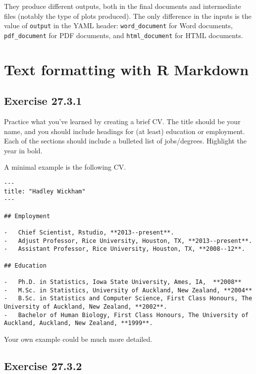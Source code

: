 \documentclass[]{book}
\theoremstyle{plain}
\theoremstyle{remark}
\theoremstyle{definition}
\theoremstyle{definition}
\theoremstyle{definition}
\theoremstyle{remark}
\begin{document}
They produce different outputs, both in the final documents and
intermediate files (notably the type of plots produced). The only
difference in the inputs is the value of \texttt{output} in the YAML
header: \texttt{word\_document} for Word documents,
\texttt{pdf\_document} for PDF documents, and \texttt{html\_document}
for HTML documents.

\hypertarget{text-formatting-with-r-markdown}{%
\section{Text formatting with R
Markdown}\label{text-formatting-with-r-markdown}}

\hypertarget{exercise-27.3.1}{%
\subsection*{\texorpdfstring{Exercise
{27.3.1}}{Exercise 27.3.1}}\label{exercise-27.3.1}}

Practice what you've learned by creating a brief CV. The title should be
your name, and you should include headings for (at least) education or
employment. Each of the sections should include a bulleted list of
jobs/degrees. Highlight the year in bold.

A minimal example is the following CV.

\begin{verbatim}
---
title: "Hadley Wickham"
---

## Employment

-   Chief Scientist, Rstudio, **2013--present**.
-   Adjust Professor, Rice University, Houston, TX, **2013--present**.
-   Assistant Professor, Rice University, Houston, TX, **2008--12**.

## Education

-   Ph.D. in Statistics, Iowa State University, Ames, IA,  **2008**
-   M.Sc. in Statistics, University of Auckland, New Zealand, **2004**
-   B.Sc. in Statistics and Computer Science, First Class Honours, The University of Auckland, New Zealand, **2002**.
-   Bachelor of Human Biology, First Class Honours, The University of Auckland, Auckland, New Zealand, **1999**.
\end{verbatim}

Your own example could be much more detailed.

\hypertarget{exercise-27.3.2}{%
\subsection*{\texorpdfstring{Exercise
{27.3.2}}{Exercise 27.3.2}}\label{exercise-27.3.2}}
\end{document}
